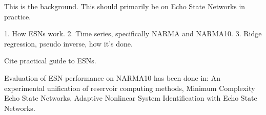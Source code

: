 This is the background. This should primarily be on Echo State Networks in practice.

1. How ESNs work.
2. Time series, specifically NARMA and NARMA10.
3. Ridge regression, pseudo inverse, how it's done.

Cite practical guide to ESNs.

Evaluation of ESN performance on NARMA10 has been done in: An experimental unification of reservoir computing methods, Minimum Complexity Echo State Networks, Adaptive Nonlinear System Identification with Echo State Networks.

